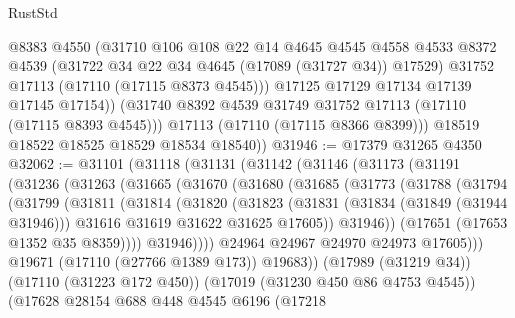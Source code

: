 \begin{lexlean}{RustStd}
\begin{coremodule}
              @8383
              @4550
              (@31710
                @106
                @108
                @22
                @14
                @4645
                @4545
                @4558
                @4533
                @8372
                @4539
                (@31722 @34 @22 @34 @4645 (@17089 (@31727 @34)) @17529)
                @31752
                @17113
                (@17110 (@17115 @8373 @4545)))
              @17125
              @17129
              @17134
              @17139
              @17145
              @17154))
          (@31740 @8392 @4539 @31749 @31752 @17113 (@17110 (@17115 @8393 @4545)))
          @17113
          (@17110 (@17115 @8366 @8399)))
        @18519
        @18522
        @18525
        @18529
        @18534
        @18540))
@31946 := @17379 @31265 @4350
@32062 := @31101
    (@31118
      (@31131
        (@31142
          (@31146
            (@31173
              (@31191
                (@31236
                  (@31263
                    (@31665
                      (@31670
                        (@31680
                          (@31685
                            (@31773
                              (@31788
                                (@31794
                                  (@31799
                                    (@31811
                                      (@31814
                                        (@31820
                                          (@31823
                                            (@31831
                                              (@31834 (@31849 (@31944 @31946)))
                                              @31616
                                              @31619
                                              @31622
                                              @31625
                                              @17605))
                                          @31946))
                                      (@17651 (@17653 @1352 @35 @8359))))
                                  @31946))))
                          @24964
                          @24967
                          @24970
                          @24973
                          @17605)))
                    @19671
                    (@17110 (@27766 @1389 @173))
                    @19683))
                (@17989 (@31219 @34))
                (@17110 (@31223 @172 @450))
                (@17019 (@31230 @450 @86 @4753 @4545))
                (@17628
                  @28154
                  @688
                  @448
                  @4545
                  @6196
                  (@17218

\end{coremodule}
\end{lexlean}
